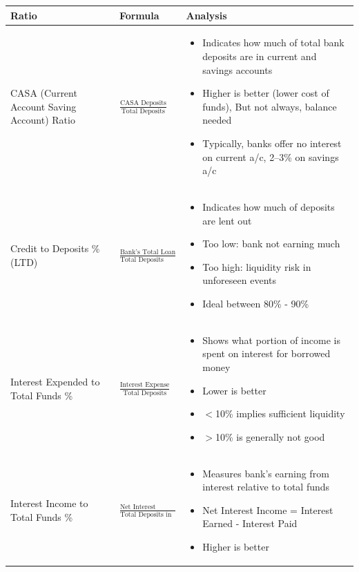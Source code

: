 \documentclass[12pt]{article}
\begin{document}
\renewcommand{\arraystretch}{1.5}
\begin{longtable}{|>{\raggedright\arraybackslash}m{4.5cm}|>{\raggedright\arraybackslash}m{5cm}|>{\raggedright\arraybackslash}m{6cm}|}
\hline
\textbf{Ratio} & \textbf{Formula} & \textbf{Analysis} \\
\hline

CASA (Current Account Saving Account) Ratio & 
$\frac{\text{CASA Deposits}}{\text{Total Deposits}}$ &
\begin{itemize}
\item Indicates how much of total bank deposits are in current and savings accounts
\item Higher is better (lower cost of funds), But not always, balance needed
\item Typically, banks offer no interest on current a/c, 2--3\% on savings a/c
\end{itemize} \\
\hline

Credit to Deposits \% (LTD) & 
$\frac{\text{Bank's Total Loan Disbursed}}{\text{Total Deposits Received}}$ &
\begin{itemize}
\item Indicates how much of deposits are lent out
\item Too low: bank not earning much
\item Too high: liquidity risk in unforeseen events
\item Ideal between 80\% - 90\%
\end{itemize} \\
\hline

Interest Expended to Total Funds \% & 
$\frac{\text{Interest Expense}}{\text{Total Deposits}}$ &
\begin{itemize}
\item Shows what portion of income is spent on interest for borrowed money
\item Lower is better
\item $<$10\% implies sufficient liquidity
\item $>$10\% is generally not good
\end{itemize} \\
\hline

Interest Income to Total Funds \% & 
$\frac{\text{Net Interest Income}}{\text{Total Deposits in Bank}}$ &
\begin{itemize}
\item Measures bank's earning from interest relative to total funds
\item Net Interest Income = Interest Earned - Interest Paid
\item Higher is better
\end{itemize} \\
\hline


\end{longtable}
\end{document}
